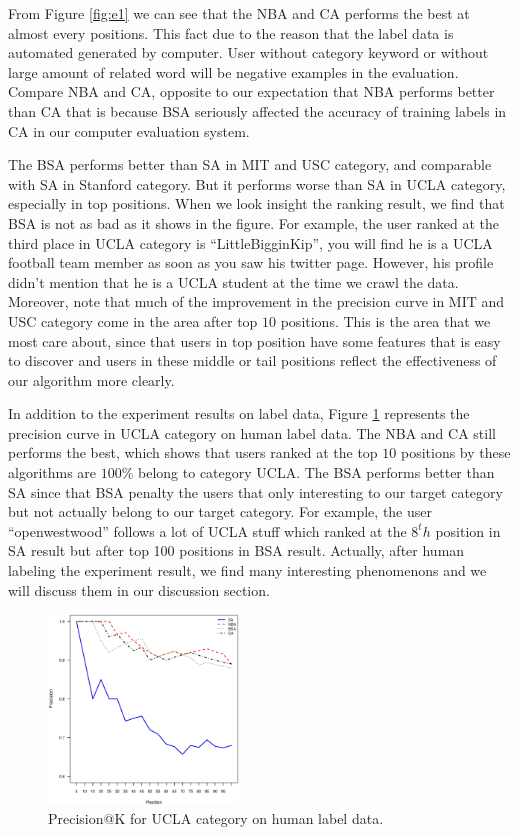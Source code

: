 \documentclass{article}
\begin{document}
From Figure \ref{fig:e1} we can see that the NBA and CA performs the best at almost every positions. This fact due to the reason that the label data is automated generated by computer. User without category keyword or without large amount of related word will be negative examples in the evaluation. Compare NBA and CA, opposite to our expectation that NBA performs better than CA that is because BSA seriously affected the accuracy of training labels in CA in our computer evaluation system.

The BSA performs better than SA in MIT and USC category, and comparable with SA in Stanford category. But it performs worse than SA in UCLA category, especially in top positions. When we look insight the ranking result, we find that BSA is not as bad as it shows in the figure. For example, the user ranked at the third place in UCLA category is ``LittleBigginKip'', you will find he is a UCLA football team member as soon as you saw his twitter page. However, his profile didn't mention that he is a UCLA student at the time we crawl the data. Moreover, note that much of the improvement in the precision curve in MIT and USC category come in the area after top $10$ positions. This is the area that we most care about, since that users in top position have some features that is easy to discover and users in these middle or tail positions reflect the effectiveness of our algorithm more clearly.

In addition to the experiment results on label data, Figure \ref{fig:e2} represents the precision curve in UCLA category on human label data. The NBA and CA still performs the best, which shows that users ranked at the top $10$ positions by these algorithms are $100\%$ belong to category UCLA. The BSA performs better than SA since that BSA penalty the users that only interesting to our target category but not actually belong to our target category. For example, the user ``openwestwood'' follows a lot of UCLA stuff which ranked at the $8^th$ position in SA result but after top 100 positions in BSA result. Actually, after human labeling the experiment result, we find many interesting phenomenons and we will discuss them in our discussion section.
\begin{figure}[h]
\centering
\includegraphics[width=0.45\textwidth]{experiment/e1.ucla.pool.eps}
\caption{Precision@K for UCLA category on human label data.}
\label{fig:e2}
\end{figure}
\end{document}
